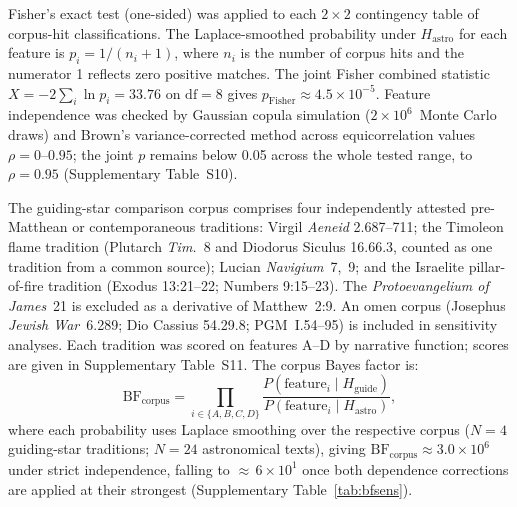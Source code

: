 \documentclass[sn-nature]{sn-jnl}
\begin{document}
Fisher's exact test (one-sided) was applied to each $2\times2$ contingency
table of corpus-hit classifications. The Laplace-smoothed probability under
$H_\text{astro}$ for each feature is $p_i = 1/(n_i+1)$, where $n_i$ is the
number of corpus hits and the numerator 1 reflects zero positive matches.
The joint Fisher combined statistic $X=-2\sum_i\ln p_i = 33.76$ on
$\mathrm{df}=8$ gives $p_\text{Fisher}\approx4.5\times10^{-5}$. Feature
independence was checked by Gaussian copula simulation ($2\times10^6$~Monte
Carlo draws) and Brown's variance-corrected method across equicorrelation
values $\rho=0$--$0.95$; the joint $p$ remains below 0.05 across the whole tested range, to $\rho=0.95$ (Supplementary Table~S10).

The guiding-star comparison corpus comprises four independently attested
pre-Matthean or contemporaneous traditions: Virgil \textit{Aeneid}
2.687--711; the Timoleon flame tradition (Plutarch \textit{Tim.}~8 and
Diodorus Siculus 16.66.3, counted as one tradition from a common source);
Lucian \textit{Navigium}~7,~9; and the Israelite pillar-of-fire tradition
(Exodus 13:21--22; Numbers 9:15--23). The \textit{Protoevangelium of James}~21 is excluded as a
derivative of Matthew~2:9. An omen corpus (Josephus \textit{Jewish
War}~6.289; Dio Cassius 54.29.8; PGM~I.54--95) is included in sensitivity
analyses. Each tradition was scored on features A--D by narrative function;
scores are given in Supplementary Table~S11. The corpus Bayes factor is:
\begin{equation}
  \mathrm{BF}_\text{corpus}
    = \prod_{i\in\{A,B,C,D\}}
      \frac{P(\text{feature}_i \mid H_\text{guide})}
           {P(\text{feature}_i \mid H_\text{astro})},
\end{equation}
where each probability uses Laplace smoothing over the respective corpus
($N=4$ guiding-star traditions; $N=24$ astronomical texts), giving
$\mathrm{BF}_\text{corpus}\approx3.0\times10^{6}$ under strict independence,
falling to ${\approx}\,6\times10^{1}$ once both dependence corrections are
applied at their strongest (Supplementary Table~\ref{tab:bfsens}).
\end{document}
